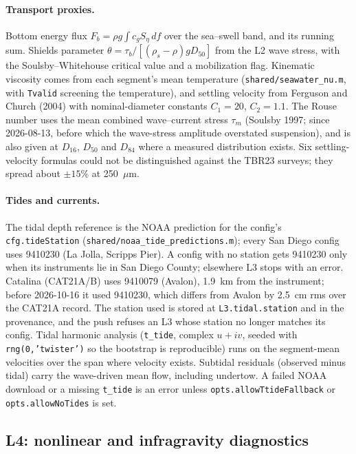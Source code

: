\documentclass[11pt]{article}
\newcommand{\code}[1]{\texttt{#1}}
\begin{document}
\paragraph{Transport proxies.} Bottom energy flux $F_b = \rho g \int c_g S_\eta\,df$ over the
sea--swell band, and its running sum. Shields parameter
$\theta = \tau_b/[(\rho_s-\rho)gD_{50}]$ from the L2 wave stress, with the Soulsby--Whitehouse
critical value and a mobilization flag. Kinematic viscosity comes from each segment's mean
temperature (\code{shared/seawater\_nu.m}, with \code{Tvalid} screening the temperature), and
settling velocity from Ferguson and Church (2004) with nominal-diameter constants $C_1 = 20$,
$C_2 = 1.1$. The Rouse number uses the mean combined wave--current stress $\tau_m$ (Soulsby
1997; since 2026-08-13, before which the wave-stress amplitude overstated suspension), and is
also given at $D_{16}$, $D_{50}$ and $D_{84}$ where a measured distribution exists. Six
settling-velocity formulas could not be distinguished against the TBR23 surveys; they spread
about $\pm15$\% at 250~$\mu$m.

\paragraph{Tides and currents.} The tidal depth reference is the NOAA prediction for the
config's \code{cfg.tideStation} (\code{shared/noaa\_tide\_predictions.m}); every San Diego config
uses 9410230 (La Jolla, Scripps Pier). A config with no station gets 9410230 only when its
instruments lie in San Diego County; elsewhere L3 stops with an error. Catalina (CAT21A/B) uses
9410079 (Avalon), 1.9~km from the instrument; before 2026-10-16 it used 9410230, which differs
from Avalon by 2.5~cm rms over the CAT21A record. The station used is stored at
\code{L3.tidal.station} and in the provenance, and the push refuses an L3 whose station no longer
matches its config. Tidal harmonic analysis (\code{t\_tide}, complex $u+iv$, seeded with
\code{rng(0,'twister')} so the bootstrap is reproducible) runs on the segment-mean velocities
over the span where velocity exists. Subtidal residuals (observed minus tidal) carry the
wave-driven mean flow, including undertow. A failed NOAA download or a missing \code{t\_tide} is
an error unless \code{opts.allowTtideFallback} or \code{opts.allowNoTides} is set.

\subsection{L4: nonlinear and infragravity diagnostics}
\end{document}
